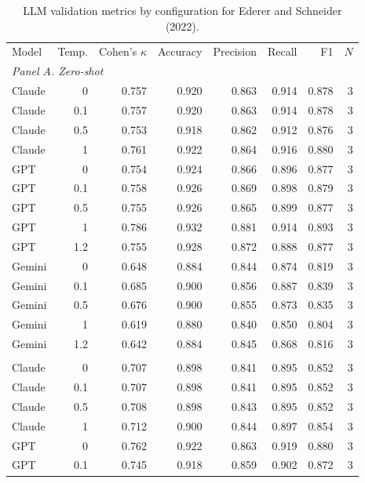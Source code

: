 \begin{table}[htbp]
\centering
\caption{LLM validation metrics by configuration for Ederer and Schneider (2022).}
\label{tab:metrics_trust_promises_Ederer_Schneider}
\small
\begin{threeparttable}
\begin{tabular}{lrrrrrrr}
\toprule
Model & Temp. & Cohen's $\kappa$ & Accuracy & Precision & Recall & F1 & $N$
\\
\multicolumn{8}{l}{\textit{Panel A. Zero-shot}} \\
\midrule
Claude & 0 & 0.757 & 0.920 & 0.863 & 0.914 & 0.878 & 3 \\
Claude & 0.1 & 0.757 & 0.920 & 0.863 & 0.914 & 0.878 & 3 \\
Claude & 0.5 & 0.753 & 0.918 & 0.862 & 0.912 & 0.876 & 3 \\
Claude & 1 & 0.761 & 0.922 & 0.864 & 0.916 & 0.880 & 3 \\
GPT & 0 & 0.754 & 0.924 & 0.866 & 0.896 & 0.877 & 3 \\
GPT & 0.1 & 0.758 & 0.926 & 0.869 & 0.898 & 0.879 & 3 \\
GPT & 0.5 & 0.755 & 0.926 & 0.865 & 0.899 & 0.877 & 3 \\
GPT & 1 & 0.786 & 0.932 & 0.881 & 0.914 & 0.893 & 3 \\
GPT & 1.2 & 0.755 & 0.928 & 0.872 & 0.888 & 0.877 & 3 \\
Gemini & 0 & 0.648 & 0.884 & 0.844 & 0.874 & 0.819 & 3 \\
Gemini & 0.1 & 0.685 & 0.900 & 0.856 & 0.887 & 0.839 & 3 \\
Gemini & 0.5 & 0.676 & 0.900 & 0.855 & 0.873 & 0.835 & 3 \\
Gemini & 1 & 0.619 & 0.880 & 0.840 & 0.850 & 0.804 & 3 \\
Gemini & 1.2 & 0.642 & 0.884 & 0.845 & 0.868 & 0.816 & 3 \\
\addlinespace[0.35em]
\multicolumn{8}{l}{\textit{Panel B. Few-shot}} \\
\midrule
Claude & 0 & 0.707 & 0.898 & 0.841 & 0.895 & 0.852 & 3 \\
Claude & 0.1 & 0.707 & 0.898 & 0.841 & 0.895 & 0.852 & 3 \\
Claude & 0.5 & 0.708 & 0.898 & 0.843 & 0.895 & 0.852 & 3 \\
Claude & 1 & 0.712 & 0.900 & 0.844 & 0.897 & 0.854 & 3 \\
GPT & 0 & 0.762 & 0.922 & 0.863 & 0.919 & 0.880 & 3 \\
GPT & 0.1 & 0.745 & 0.918 & 0.859 & 0.902 & 0.872 & 3 \\

\end{tabular}
\end{threeparttable}
\end{table}
